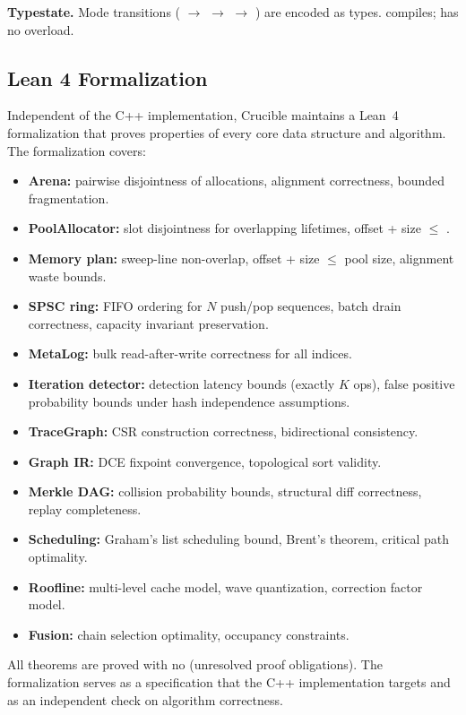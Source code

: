 \textbf{Typestate.}
Mode transitions ( $\to$  $\to$  $\to$ ) are encoded as types.
 compiles;  has no overload.

\subsection{Lean 4 Formalization}

Independent of the C++ implementation, Crucible maintains a Lean~4 formalization that proves properties of every core data structure and algorithm.
The formalization covers:

\begin{itemize}
  \item \textbf{Arena:} pairwise disjointness of allocations, alignment correctness, bounded fragmentation.
  \item \textbf{PoolAllocator:} slot disjointness for overlapping lifetimes, offset + size $\leq$ .
  \item \textbf{Memory plan:} sweep-line non-overlap, offset + size $\leq$ pool size, alignment waste bounds.
  \item \textbf{SPSC ring:} FIFO ordering for $N$ push/pop sequences, batch drain correctness, capacity invariant preservation.
  \item \textbf{MetaLog:} bulk read-after-write correctness for all indices.
  \item \textbf{Iteration detector:} detection latency bounds (exactly $K$ ops), false positive probability bounds under hash independence assumptions.
  \item \textbf{TraceGraph:} CSR construction correctness, bidirectional consistency.
  \item \textbf{Graph IR:} DCE fixpoint convergence, topological sort validity.
  \item \textbf{Merkle DAG:} collision probability bounds, structural diff correctness, replay completeness.
  \item \textbf{Scheduling:} Graham's list scheduling bound, Brent's theorem, critical path optimality.
  \item \textbf{Roofline:} multi-level cache model, wave quantization, correction factor model.
  \item \textbf{Fusion:} chain selection optimality, occupancy constraints.
\end{itemize}

All theorems are proved with no  (unresolved proof obligations).
The formalization serves as a specification that the C++ implementation targets and as an independent check on algorithm correctness.
